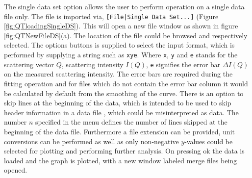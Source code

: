 The single data set option allows the user to perform operation on a
single data file only. The file is imported via,
\verb"[File|Single Data Set...]" (Figure \ref{fig:QTloadingSingleDS}).
This will open a new file window as shown in figure
\ref{fig:QTNewFileDS}(a). The location of the file could be browsed
and respectively selected. The options buttons is supplied to select
the input format, which is performed by supplying a string such as
\texttt{xye}. Where \texttt{x}, \texttt{y} and \texttt{e} stands for
the scattering vector $Q$, scattering intensity $I(Q)$, \texttt{e}
signifies the error bar $\Delta I(Q)$ on the measured scattering intensity.
The error bars are required during the fitting operation and for files
which do not contain the error bar column it would be calculated by
default from the smoothing of the curve. There is an option to skip
lines at the beginning of the data, which is intended to be used to
skip header information in a data file , which could be misinterpreted
as data. The number $n$ specified in the menu defines the number of
lines skipped at the beginning of the data file.
Furthermore a file extension can be provided, unit conversions can be
performed as well as only non-negative $y$-values could be selected
for plotting and performing further analysis. On pressing ok the
data is loaded and the graph is plotted, with a new window labeled
merge files being opened.


